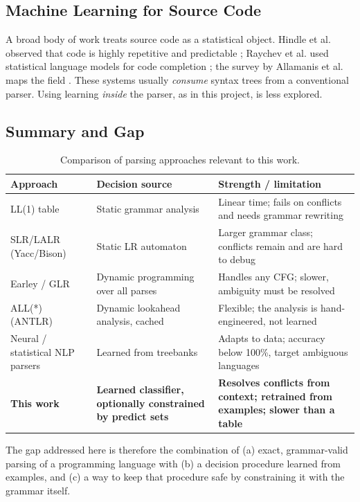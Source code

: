 \documentclass[12pt,a4paper]{article}
\begin{document}
\subsection{Machine Learning for Source Code}

A broad body of work treats source code as a statistical object. Hindle et al.
observed that code is highly repetitive and predictable \cite{hindle2012};
Raychev et al. used statistical language models for code completion
\cite{raychev2014}; the survey by Allamanis et al. maps the field
\cite{allamanis2018}. These systems usually \emph{consume} syntax trees from a
conventional parser. Using learning \emph{inside} the parser, as in this
project, is less explored.

\subsection{Summary and Gap}

\begin{table}[H]
\centering
\caption{Comparison of parsing approaches relevant to this work.}
\label{tab:survey}
\small
\begin{tabularx}{\textwidth}{p{3.0cm}p{3.1cm}X}
\toprule
\textbf{Approach} & \textbf{Decision source} & \textbf{Strength / limitation}\\
\midrule
LL(1) table & Static grammar analysis & Linear time; fails on conflicts and needs grammar rewriting\\
SLR/LALR (Yacc/Bison) & Static LR automaton & Larger grammar class; conflicts remain and are hard to debug\\
Earley / GLR & Dynamic programming over all parses & Handles any CFG; slower, ambiguity must be resolved\\
ALL(*) (ANTLR) & Dynamic lookahead analysis, cached & Flexible; the analysis is hand-engineered, not learned\\
Neural / statistical NLP parsers & Learned from treebanks & Adapts to data; accuracy below 100\%, target ambiguous languages\\
\textbf{This work} & \textbf{Learned classifier, optionally constrained by predict sets} & \textbf{Resolves conflicts from context; retrained from examples; slower than a table}\\
\bottomrule
\end{tabularx}
\end{table}

The gap addressed here is therefore the combination of (a) exact, grammar-valid
parsing of a programming language with (b) a decision procedure learned from
examples, and (c) a way to keep that procedure safe by constraining it with the
grammar itself.
\end{document}
